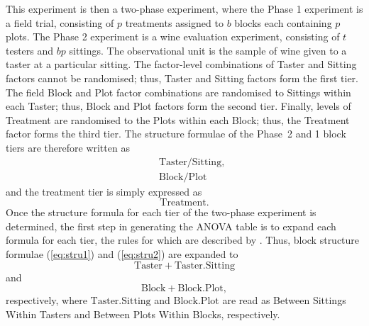 This experiment is then a two-phase experiment, where the Phase 1 experiment is a field trial, consisting of $p$ treatments assigned to $b$ blocks each containing $p$ plots. The Phase 2 experiment is a wine evaluation experiment, consisting of $t$ testers and $bp$ sittings. The observational unit is the sample of wine given to a taster at a particular sitting. The factor-level combinations of Taster and Sitting factors cannot be randomised; thus, Taster and Sitting factors form the first tier. The field Block and Plot factor combinations are randomised to Sittings within each Taster; thus, Block and Plot factors form the second tier. Finally, levels of Treatment are randomised to the Plots within each Block; thus, the Treatment factor forms the third tier. The structure formulae of the Phase~2 and 1 block tiers are therefore written as
\begin{eqnarray}
\label{eq:stru1}&&\mathrm{Taster/Sitting},\\
\label{eq:stru2}&&\mathrm{Block/Plot}
\end{eqnarray}
and the treatment tier is simply expressed as
\begin{equation}\label{eq:stru3}
\mathrm{Treatment.}
\end{equation}
Once the structure formula for each tier of the two-phase experiment is determined, the first step in generating the ANOVA table is to expand each formula for each tier, the rules for which are described by \cite{Wilkinson1973}. Thus, block structure formulae  (\ref{eq:stru1}) and (\ref{eq:stru2}) are expanded to 
\begin{equation}\label{eq:stru1expanded}
\mathrm{Taster + Taster.Sitting}
\end{equation}
and 
\begin{equation}\label{eq:stru2expanded}
\mathrm{Block + Block.Plot},
\end{equation}
respectively, where $\mathrm{Taster.Sitting}$ and $\mathrm{Block.Plot}$ are read as Between Sittings Within Tasters and Between Plots Within Blocks, respectively. 

